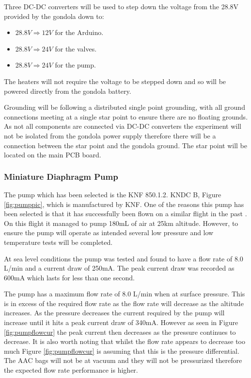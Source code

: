 \begin{centering}
Three DC-DC converters will be used to step down the voltage from the 28.8V provided by the gondola down to: 
\end{centering}

\begin{centering}
\begin{itemize}
  \item $28.8V \Longrightarrow 12V$ for the Arduino.  
  \item $28.8V \Longrightarrow 24V$ for the valves.
  \item $28.8V \Longrightarrow 24V$ for the pump.
  \end{itemize}

\end{centering}
\bigskip

\begin{centering}
The heaters will not require the voltage to be stepped down and so will be powered directly from the gondola battery.
\end{centering}
\bigskip

Grounding will be following a distributed single point grounding, with all ground connections meeting at a single star point to ensure there are no floating grounds. As not all components are connected via DC-DC converters the experiment will not be isolated from the gondola power supply therefore there will be a connection between the star point and the gondola ground. The star point will be located on the main PCB board.

\subsubsection{Miniature Diaphragm Pump}
The pump which has been selected is the KNF 850.1.2. KNDC B, Figure \ref{fig:pumppic}, which is manufactured by KNF. One of the reasons this pump has been selected is that it has successfully been flown on a similar flight in the past \cite{LISA}. On this flight it managed to pump 180mL of air at 25km altitude. However, to ensure the pump will operate as intended several low pressure and low temperature tests will be completed.

At sea level conditions the pump was tested and found to have a flow rate of 8.0 L/min and a current draw of 250mA. The peak current draw was recorded as 600mA which lasts for less than one second. 

The pump has a maximum flow rate of 8.0 L/min when at surface pressure. This is in excess of the required flow rate as the flow rate will decrease as the altitude increases. As the pressure decreases the current required by the pump will increase until it hits a peak current draw of 340mA. However as seen in Figure \ref{fig:pumpflowcur} the peak current then decreases as the pressure continues to decrease. It is also worth noting that whilst the flow rate appears to decrease too much Figure \ref{fig:pumpflowcur} is assuming that this is the pressure differential. The AAC bags will not be at vacuum and they will not be pressurized therefore the expected flow rate performance is higher.

